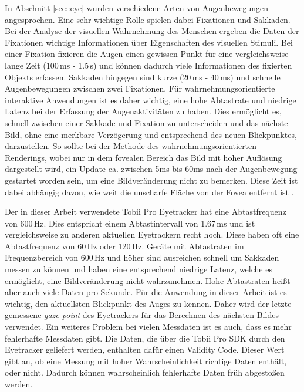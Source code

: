 In Abschnitt \ref{sec::eye} wurden verschiedene Arten von Augenbewegungen angesprochen.
Eine sehr wichtige Rolle spielen dabei Fixationen und Sakkaden.
Bei der Analyse der visuellen Wahrnehmung des Menschen ergeben die Daten der Fixationen wichtige Informationen über Eigenschaften des visuellen Stimuli.
Bei einer Fixation fixieren die Augen einen gewissen Punkt für eine vergleichsweise lange Zeit (100\,ms - 1.5\,s) und können dadurch viele Informationen des fixierten Objekts erfassen.
Sakkaden hingegen sind kurze (20\,ms - 40\,ms) und schnelle Augenbewegungen zwischen zwei Fixationen.
Für wahrnehmungsorientierte interaktive Anwendungen ist es daher wichtig, eine hohe Abtastrate und niedrige Latenz bei der Erfassung der Augenaktivitäten zu haben.
Dies ermöglicht es, schnell zwischen einer Sakkade und Fixation zu unterscheiden und das nächste Bild, ohne eine merkbare Verzögerung und entsprechend des neuen Blickpunktes, darzustellen.
So sollte bei der Methode des wahrnehmungsorientierten Renderings, wobei nur in dem fovealen Bereich das Bild mit hoher Auflösung dargestellt wird, ein Update ca. zwischen 5ms bis 60ms nach der Augenbewegung gestartet worden sein, um eine Bildveränderung nicht zu bemerken.
Diese Zeit ist dabei abhängig davon, wie weit die unscharfe Fläche von der Fovea entfernt ist \cite{doi:10.1111/cgf.13150}.

Der in dieser Arbeit verwendete Tobii Pro Eyetracker hat eine Abtastfrequenz von 600\,Hz.
Dies entspricht einem Abtastintervall von 1.67\,ms und ist vergleichsweise zu anderen aktuellen Eyetrackern recht hoch.
Diese haben oft eine Abtastfrequenz von 60\,Hz oder 120\,Hz.
Geräte mit Abtastraten im Frequenzbereich von 600\,Hz und höher sind ausreichen schnell um Sakkaden messen zu können und haben eine entsprechend niedrige Latenz, welche es ermöglicht, eine Bildveränderung nicht wahrzunehmen.
Hohe Abtastraten heißt aber auch viele Daten pro Sekunde.
Für die Anwendung in dieser Arbeit ist es wichtig, den aktuellsten Blickpunkt des Auges zu kennen.
Daher wird der letzte gemessene \emph{gaze point} des Eyetrackers für das Berechnen des nächsten Bildes verwendet.
Ein weiteres Problem bei vielen Messdaten ist es auch, dass es mehr fehlerhafte Messdaten gibt.
Die Daten, die über die Tobii Pro SDK durch den Eyetracker geliefert werden, enthalten dafür einen Validity Code.
Dieser Wert gibt an, ob eine Messung mit hoher Wahrscheinlichkeit richtige Daten enthält, oder nicht.
Dadurch können wahrscheinlich fehlerhafte Daten früh abgestoßen werden.

